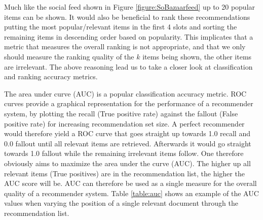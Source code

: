 Much like the social feed shown in Figure \ref{figure:SoBazaarfeed} up to 20 popular items can be shown.
It would also be beneficial to rank these recommendations putting the most popular/relevant items in the first 4 slots and sorting the remaining items in descending order based on popularity. This implicates that a metric that measures the overall ranking is not appropriate, and that we only should measure the ranking quality of the $k$ items being shown, the other items are irrelevant. The above reasoning lead us to take a closer look at classification and ranking accuracy metrics.


The area under curve (AUC) is a popular classification accuracy metric. ROC curves provide a graphical
representation for the performance of a recommender system, by plotting the recall (True positive rate)
against the fallout (False positive rate) for increasing recommendation set size. A perfect recommender
would therefore yield a ROC curve that goes straight up towards 1.0 recall and 0.0 fallout until all
relevant items are retrieved. Afterwards it would go straight towards 1.0 fallout while the remaining
irrelevant items follow. One therefore obviously aims to maximize the area under the curve (AUC). The higher
up all relevant items (True positives) are in the recommendation list, the higher the AUC score will be.
AUC can therefore be used as a single measure for the overall quality of a recommender system. Table \ref{table:auc}
shows an example of the AUC values when varying the position of a single relevant document through the
recommendation list.

